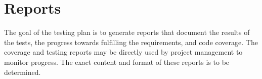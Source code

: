 %
%
\section{Reports}
\label{sec:reports}

The goal of the testing plan is to generate reports that document the results of the tests, the progress towards fulfilling the requirements, and code coverage. 
The coverage and testing reports may be directly used by project management to monitor progress. The exact content and format of these reports is to be determined.

%
%
